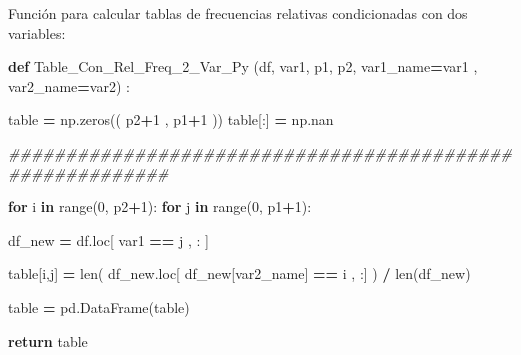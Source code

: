 \documentclass[
  11pt,
  a4paper,
]{article}
\newenvironment{Shaded}{\begin{snugshade}}{\end{snugshade}}
\newcommand{\BuiltInTok}[1]{#1}
\newcommand{\CommentTok}[1]{\textcolor[rgb]{0.56,0.35,0.01}{\textit{#1}}}
\newcommand{\ControlFlowTok}[1]{\textcolor[rgb]{0.13,0.29,0.53}{\textbf{#1}}}
\newcommand{\DecValTok}[1]{\textcolor[rgb]{0.00,0.00,0.81}{#1}}
\newcommand{\KeywordTok}[1]{\textcolor[rgb]{0.13,0.29,0.53}{\textbf{#1}}}
\newcommand{\NormalTok}[1]{#1}
\newcommand{\OperatorTok}[1]{\textcolor[rgb]{0.81,0.36,0.00}{\textbf{#1}}}
\newcommand{\StringTok}[1]{\textcolor[rgb]{0.31,0.60,0.02}{#1}}
\begin{document}
Función para calcular tablas de frecuencias relativas condicionadas con
dos variables:

\begin{Shaded}
\begin{Highlighting}[]
\KeywordTok{def}\NormalTok{ Table\_Con\_Rel\_Freq\_2\_Var\_Py (df, var1, p1, p2, var1\_name}\OperatorTok{=}\StringTok{\textquotesingle{}var1\textquotesingle{}}\NormalTok{ , var2\_name}\OperatorTok{=}\StringTok{\textquotesingle{}var2\textquotesingle{}}\NormalTok{) :}

\NormalTok{    table }\OperatorTok{=}\NormalTok{ np.zeros(( p2}\OperatorTok{+}\DecValTok{1}\NormalTok{ , p1}\OperatorTok{+}\DecValTok{1}\NormalTok{ ))}
\NormalTok{    table[:] }\OperatorTok{=}\NormalTok{ np.nan}

\CommentTok{\#\#\#\#\#\#\#\#\#\#\#\#\#\#\#\#\#\#\#\#\#\#\#\#\#\#\#\#\#\#\#\#\#\#\#\#\#\#\#\#\#\#\#\#\#\#\#\#\#\#\#\#\#\#\#\#\#\#}

    \ControlFlowTok{for}\NormalTok{ i }\KeywordTok{in} \BuiltInTok{range}\NormalTok{(}\DecValTok{0}\NormalTok{, p2}\OperatorTok{+}\DecValTok{1}\NormalTok{):}
        \ControlFlowTok{for}\NormalTok{ j }\KeywordTok{in} \BuiltInTok{range}\NormalTok{(}\DecValTok{0}\NormalTok{, p1}\OperatorTok{+}\DecValTok{1}\NormalTok{):}

\NormalTok{            df\_new }\OperatorTok{=}\NormalTok{ df.loc[ var1 }\OperatorTok{==}\NormalTok{ j   , : ]}

\NormalTok{            table[i,j] }\OperatorTok{=} \BuiltInTok{len}\NormalTok{( df\_new.loc[ df\_new[var2\_name] }\OperatorTok{==}\NormalTok{ i , :] ) }\OperatorTok{/} \BuiltInTok{len}\NormalTok{(df\_new)}
    
\NormalTok{    table }\OperatorTok{=}\NormalTok{ pd.DataFrame(table)}

    \ControlFlowTok{return}\NormalTok{ table}
\end{Highlighting}
\end{Shaded}
\end{document}
